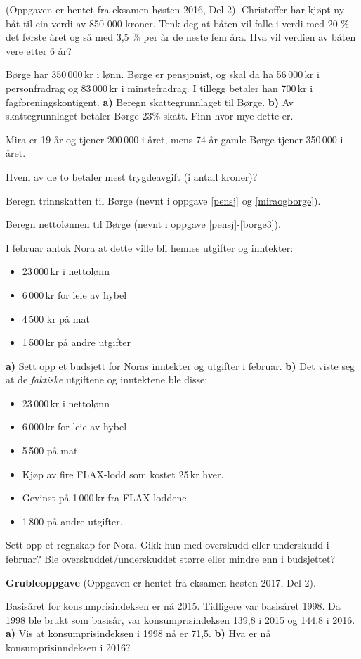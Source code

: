 (Oppgaven er hentet fra eksamen høsten 2016, Del 2).\os
Christoffer har kjøpt ny båt til ein verdi av 850 000 kroner.
Tenk deg at båten vil falle i verdi med 20 \% det første året og så med 3,5 \% per år de neste fem åra.\os
Hva vil verdien av båten vere etter 6 år? 

\nes

Børge har 350\,000\,kr i lønn. Børge er pensjonist, og skal da ha 56\,000\,kr i personfradrag og 83\,000\,kr i minstefradrag. I tillegg betaler han 700\,kr i fagforeningskontigent. \os
\textbf{a)} Beregn skattegrunnlaget til Børge.\os
\textbf{b)} Av skattegrunnlaget betaler Børge 23\% skatt. Finn hvor mye dette er.

Mira er 19 år og tjener 200\,000 i året, mens 74 år gamle Børge tjener 350\,000 i året. \os

Hvem av de to betaler mest trygdeavgift (i antall kroner)?

Beregn trinnskatten til Børge (nevnt i oppgave \ref{pensj} og \ref{miraogborge}).

Beregn nettolønnen til Børge (nevnt i oppgave \ref{pensj}-\ref{borge3}).

\nes

I februar antok Nora at dette ville bli hennes utgifter og inntekter:
\begin{itemize}
	\item 23\,000\,kr i nettolønn 
	\item 6\,000\,kr for leie av hybel
	\item 4\,500 kr på mat
	\item 1\,500\,kr på andre utgifter
\end{itemize}
\textbf{a)} Sett opp et budsjett for Noras inntekter og utgifter i februar.\os
\textbf{b)} Det viste seg at de \textsl{faktiske} utgiftene og inntektene ble disse:
\begin{itemize}
	\item 23\,000\,kr i nettolønn
	\item 6\,000\,kr for leie av hybel
	\item 5\,500 på mat
	\item Kjøp av fire FLAX-lodd som kostet 25\,kr hver.
	\item Gevinst på 1\,000\,kr fra FLAX-loddene
	\item 1\,800 på andre utgifter.
\end{itemize}
Sett opp et regnskap for Nora. Gikk hun med overskudd eller underskudd i februar? Ble overskuddet/underskuddet større eller mindre enn i budsjettet?
\vsk

\newpage
\textbf{\color{blue}Grubleoppgave}\os
(Oppgaven er hentet fra eksamen høsten 2017, Del 2).\os

Basisåret for konsumprisindeksen er nå 2015. Tidligere var basisåret 1998.\os
Da 1998 ble brukt som basisår, var konsumprisindeksen 139,8 i 2015 og 144,8 i 2016.\os
\textbf{a)} Vis at konsumprisindeksen i 1998 nå er 71,5.\os
\textbf{b)} Hva er nå konsumprisinndeksen i 2016?


